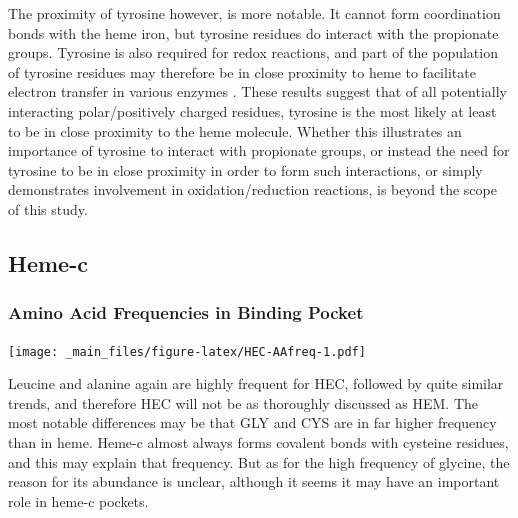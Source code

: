 \documentclass[a4paper, nobind]{templates/ociamthesis}
\let\origfigure\figure
\let\endorigfigure\endfigure
\renewenvironment{figure}[1][2] {
    \expandafter\origfigure\expandafter[H]
} {
    \endorigfigure
}
\begin{document}
The proximity of tyrosine however, is more notable. It cannot form coordination bonds with the heme iron, but tyrosine residues do interact with the propionate groups. Tyrosine is also required for redox reactions, and part of the population of tyrosine residues may therefore be in close proximity to heme to facilitate electron transfer in various enzymes \autocite{Poulos2014}. These results suggest that of all potentially interacting polar/positively charged residues, tyrosine is the most likely at least to be in close proximity to the heme molecule. Whether this illustrates an importance of tyrosine to interact with propionate groups, or instead the need for tyrosine to be in close proximity in order to form such interactions, or simply demonstrates involvement in oxidation/reduction reactions, is beyond the scope of this study.

\hypertarget{heme-c-1}{%
\subsection{Heme-c}\label{heme-c-1}}

\hypertarget{amino-acid-frequencies-in-binding-pocket-1}{%
\subsubsection{Amino Acid Frequencies in Binding Pocket}\label{amino-acid-frequencies-in-binding-pocket-1}}

\begin{figure}
\centering
\texttt{[image: \_main\_files/figure-latex/HEC-AAfreq-1.pdf]}
\caption{\label{fig:HEC-AAfreq}HEC: AA Frequency within 7A}
\end{figure}

Leucine and alanine again are highly frequent for HEC, followed by quite similar trends, and therefore HEC will not be as thoroughly discussed as HEM. The most notable differences may be that GLY and CYS are in far higher frequency than in heme. Heme-c almost always forms covalent bonds with cysteine residues, and this may explain that frequency. But as for the high frequency of glycine, the reason for its abundance is unclear, although it seems it may have an important role in heme-c pockets.
\end{document}
